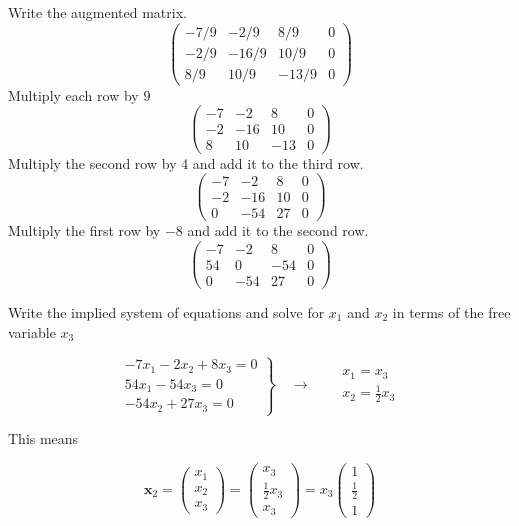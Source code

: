 \documentclass[12pt]{article}
\begin{document}
Write the augmented matrix.
$$
\left(\begin{array}{rrr|r}
-7 / 9 & -2 / 9 & 8 / 9 & 0 \\
-2 / 9 & -16 / 9 & 10 / 9 & 0 \\
8 / 9 & 10 / 9 & -13 / 9 & 0
\end{array}\right)
$$
Multiply each row by \(9\)
$$
\left(\begin{array}{rrr|r}
-7 & -2 & 8 & 0 \\
-2 & -16 & 10 & 0 \\
8 & 10 & -13 & 0
\end{array}\right)
$$
Multiply the second row by 4 and add it to the third row.
$$
\left(\begin{array}{rrr|r}
-7 & -2 & 8 & 0 \\
-2 & -16 & 10 & 0 \\
0 & -54 & 27 & 0
\end{array}\right)
$$
Multiply the first row by \(-8\) and add it to the second row.
$$
\left(\begin{array}{rrr|r}
-7 & -2 & 8 & 0 \\
54 & 0 & -54 & 0 \\
0 & -54 & 27 & 0
\end{array}\right)
$$

Write the implied system of equations and
solve for \(x_1\) and \(x_2\) in terms of the free variable \(x_3\)

\begin{equation*}
\left.\begin{array}{r}
-7 x_{1}-2 x_{2}+8 x_{3}=0 \\
54 x_{1}-54 x_{3}=0 \\
-54 x_{2}+27 x_{3}=0
\end{array}\right\} \quad \rightarrow \quad \begin{aligned}
& x_{1}=x_{3} \\
& x_{2}=\frac{1}{2} x_{3}
\end{aligned}
\end{equation*}

This means

\begin{equation*}
	\mathbf{x}_{2}=\left(\begin{array}{l}
			x_{1} \\
			x_{2} \\
			x_{3}
		\end{array}\right)=\left(\begin{array}{c}
			x_{3}             \\
			\frac{1}{2} x_{3} \\
			x_{3}
		\end{array}\right)=x_{3}\left(\begin{array}{c}
			1           \\
			\frac{1}{2} \\
			1
		\end{array}\right)
\end{equation*}
\end{document}
